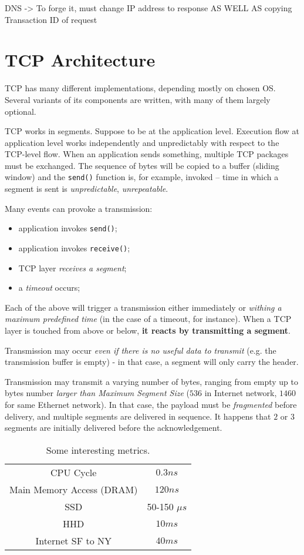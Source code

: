 \documentclass[a4paper, 11pt]{report}
\begin{document}
DNS -> To forge it, must change IP address to response AS WELL AS copying Transaction ID of request


\section{TCP Architecture}

TCP has many different implementations, depending mostly on chosen OS. Several
variants of its components are written, with many of them largely optional.

TCP works in segments. Suppose to be at the application level. Execution flow
at application level works independently and unpredictably with respect to the
TCP-level flow. When an application sends something, multiple TCP packages must
be exchanged. The sequence of bytes will be copied to a buffer (sliding window)
and the \texttt{send()} function is, for example, invoked \--- time in which a
segment is sent is \emph{unpredictable}, \emph{unrepeatable}.

Many events can provoke a transmission:

\begin{itemize}
	\item application invokes \texttt{send()};
	\item application invokes \texttt{receive()};
	\item TCP layer \emph{receives a segment};
	\item a \emph{timeout} occurs;
\end{itemize}

Each of the above will trigger a transmission either immediately or
\emph{withing a maximum predefined time} (in the case of a timeout, for
instance). When a TCP layer is touched from above or below, \textbf{it reacts
by transmitting a segment}.

Transmission may occur \emph{even if there is no useful data to transmit} (e.g.
the transmission buffer is empty) \-- in that case, a segment will only carry
the header.

Transmission may transmit a varying number of bytes, ranging from empty up to
bytes number \emph{larger than Maximum Segment Size} ($536$ in Internet
network, $1460$ for same Ethernet network). In that case, the payload must be
\emph{fragmented} before delivery, and multiple segments are delivered in sequence.
It happens that $2$ or $3$ segments are initially delivered before the
acknowledgement.

\begin{table}[ht]
\centering
\begin{tabular}{cc}
CPU Cycle & $0.3 ns$ \\
Main Memory Access (DRAM) & $120ns$ \\
SSD & 50-150 $\mu s$ \\
HHD & $10 ms$ \\
Internet SF to NY & $40ms$
\end{tabular}
\caption{Some interesting metrics.}\label{tab:SomeMetrics}
\end{table}
\bigskip
\end{document}
